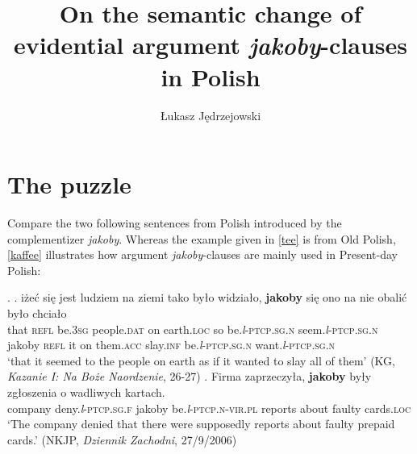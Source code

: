 \documentclass[output=paper
,modfonts
,nonflat]{langsci/langscibook}
\title{On the semantic change of evidential argument \emph{jakoby}-clauses in Polish}
\author{%
 Łukasz Jędrzejowski \affiliation{Universität zu Köln}
}
\newcommand{\glossformat}[1]{\textsc{#1}}
\newcommand{\thirdperson}{\glossformat{3}\xspace}
\newcommand{\acc}{\glossformat{acc}\xspace}
\newcommand{\dat}{\glossformat{dat}\xspace}
\newcommand{\fem}{\glossformat{f}\xspace}
\newcommand{\infv}{\glossformat{inf}\xspace}
\newcommand{\loc}{\glossformat{loc}\xspace}
\newcommand{\lptcp}{\emph{l}\glossformat{-ptcp}\xspace}
\newcommand{\n}{\glossformat{n}\xspace}
\newcommand{\nvir}{\glossformat{n-vir}\xspace}
\newcommand{\pl}{\glossformat{pl}\xspace}
\newcommand{\refl}{\glossformat{refl}\xspace}
\newcommand{\sg}{\glossformat{sg}\xspace}
\newcommand{\nquelle}[1]{\newline\phantom{x}\hfill(#1)}
\begin{document}
\maketitle

\section{The puzzle} \label{intro}

Compare the two following sentences from Polish introduced by the complementizer \emph{jakoby}. Whereas the example given in \ref{tee} is from Old Polish, \ref{kaffee} illustrates how argument \emph{jakoby}-clauses are mainly used in Present-day Polish: 

\ex.	\ag.		iżeć się jest ludziem na ziemi tako było widziało, \textbf{jakoby} się ono na nie obalić było chciało \label{tee} \\
			that {\refl} be.{\thirdperson}{\sg} people.{\dat} on earth.{\loc} so be.{\lptcp}.{\sg}.{\n} seem.{\lptcp}.{\sg}.{\n} jakoby {\refl} it on them.{\acc} slay.{\infv} be.{\lptcp}.{\sg}.{\n} want.{\lptcp}.{\sg}.{\n} \\
			`that it seemed to the people on earth as if it wanted to slay all of them' \nquelle{KG, \emph{Kazanie I: Na Boże Naordzenie}, 26-27}
	\bg.		Firma zaprzeczyła, \textbf{jakoby} były zgłoszenia o wadliwych kartach. \label{kaffee} \\
			company deny.{\lptcp}.{\sg}.{\fem} jakoby be.{\lptcp}.{\nvir}.{\pl} reports about faulty cards.{\loc} \\
			`The company denied that there were supposedly reports about faulty prepaid cards.'    \nquelle{NKJP, \emph{Dziennik Zachodni}, 27/9/2006}
\end{document}
